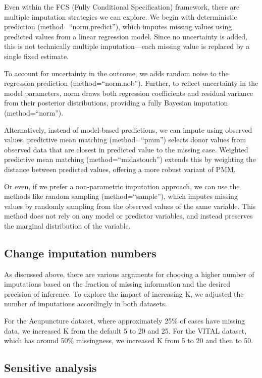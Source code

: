 \documentclass{article}
\begin{document}
Even within the FCS (Fully Conditional Specification) framework, there
are multiple imputation strategies we can explore. We begin with
deterministic prediction (method=``norm.predict''), which imputes
missing values using predicted values from a linear regression model.
Since no uncertainty is added, this is not technically multiple
imputation---each missing value is replaced by a single fixed estimate.

To account for uncertainty in the outcome, we adds random noise to the
regression prediction (method=``norm.nob''). Further, to reflect
uncertainty in the model parameters, norm draws both regression
coefficients and residual variance from their posterior distributions,
providing a fully Bayesian imputation (method=``norm'').

Alternatively, instead of model-based predictions, we can impute using
observed values. predictive mean matching (method=``pmm'') selects donor
values from observed data that are closest in predicted value to the
missing case. Weighted predictive mean matching (method=``midastouch'')
extends this by weighting the distance between predicted values,
offering a more robust variant of PMM.

Or even, if we prefer a non-parametric imputation approach, we can use
the methods like random sampling (method=``sample''), which imputes
missing values by randomly sampling from the observed values of the same
variable. This method does not rely on any model or predictor variables,
and instead preserves the marginal distribution of the variable.

\subsection{Change imputation numbers}\label{change-imputation-numbers}

As discussed above, there are various arguments for choosing a higher
number of imputations based on the fraction of missing information and
the desired precision of inference. To explore the impact of increasing
K, we adjusted the number of imputations accordingly in both datasets.

For the Acupuncture dataset, where approximately 25\% of cases have
missing data, we increased K from the default 5 to 20 and 25. For the
VITAL dataset, which has around 50\% missingness, we increased K from 5
to 20 and then to 50.

\subsection{Sensitive analysis}\label{sensitive-analysis}
\end{document}
